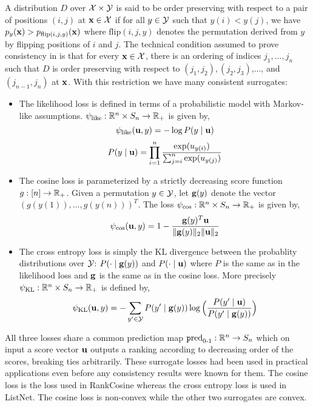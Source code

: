 A distribution $D$ over ${\mathcal X}\times{\mathcal Y}$ is said to be order preserving with respect to a pair of positions $(i,j)$ at ${\mathbf x} \in {\mathcal X}$ if for all $y \in {\mathcal Y}$ such that $y(i) < y(j)$, we have $p_y({\mathbf x}) > p_{\text{flip}(i,j,y)}({\mathbf x})$ where $\text{flip}(i,j,y)$ denotes the permutation derived from $y$ by flipping positions of $i$ and $j$. The technical condition assumed to prove consistency in \cite{xia2008listwise} is that for every ${\mathbf x} \in {\mathcal X}$, there is an ordering of indices $j_1,...,j_n$ such that $D$ is order preserving with respect to $(j_1,j_2),(j_2,j_3)$,..., and $(j_{n-1},j_n)$ at ${\mathbf x}$. With this restriction we have many consistent surrogates:
\begin{itemize}
 \item The likelihood loss is defined in terms of a probabilistic model with Markov-like assumptions. $\psi_{\text{like}}: {\mathbb R}^n \times S_n \to {\mathbb R}_+$ is given by,
 $$\psi_{\text{like}}({\mathbf u},y) = -\log P(y \mid {\mathbf u})$$
 $$P(y \mid {\mathbf u}) = \prod_{i=1}^n\frac{\exp(u_{y(i)})}{\sum_{j=i}^n\exp(u_{y(j)})}$$
 \item The cosine loss is parameterized by a strictly decreasing score function $g:[n] \to {\mathbb R}_+$. Given a permutation $y \in {\mathcal Y}$, let ${\mathbf g}(y)$ denote the vector $(g(y(1)),...,g(y(n)))^T$. The loss $\psi_{\cos}: {\mathbb R}^n \times S_n \to {\mathbb R}_+$ is given by,
 $$\psi_{\cos}({\mathbf u},y) = 1 - \frac{{\mathbf g}(y)^T{\mathbf u}}{\lVert{\mathbf g}(y)\rVert_2\lVert{\mathbf u}\rVert_2}$$
 \item The cross entropy loss is simply the KL divergence between the probablity distributions over ${\mathcal Y}$: $P(\cdot\mid{\mathbf g}(y))$ and $P(\cdot\mid{\mathbf u})$ where $P$ is the same as in the likelihood loss and ${\mathbf g}$ is the same as in the cosine loss. More precisely $\psi_{\text{KL}}:{\mathbb R}^n\times S_n \to{\mathbb R}_+$ is defined by,
 $$\psi_{\text{KL}}({\mathbf u},y) = -\sum_{y' \in {\mathcal Y}}P(y'\mid{\mathbf g}(y))\log\Big(\frac{P(y'\mid{\mathbf u})}{P(y'\mid {\mathbf g}(y))}\Big)$$
\end{itemize}
All three losses share a common prediction map $\text{\texttt pred}_{\text{0-1}}: {\mathbb R}^n \to S_n$ which on input a score vector ${\mathbf u}$ outputs a ranking according to decreasing order of the scores, breaking ties arbitrarily. These surrogate losses had been used in practical applications even before any consistency results were known for them. The cosine loss is the loss used in RankCosine whereas the cross entropy loss is used in ListNet. The cosine loss is non-convex while the other two surrogates are convex.
